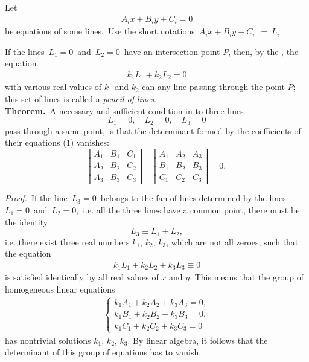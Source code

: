 \documentclass[12pt]{article}
\theoremstyle{definition}
\begin{document}
Let 
\begin{align}
A_ix+B_iy+C_i = 0
\end{align}
be equations of some lines.\, Use the short notations\, $A_ix+B_iy+C_i \,:=\, L_i$.

If the lines\, $L_1 = 0$\, and\, $L_2 = 0$\, have an intersection point $P$, then, by the , the equation
\begin{align}
k_1L_1+k_2L_2 = 0
\end{align}
with various real values of $k_1$ and $k_2$ can  any line passing through the point $P$; this set of lines is called a {\em pencil of lines}.\\
 

\textbf{Theorem.}\, A necessary and sufficient condition in  to three lines
$$L_1 = 0, \quad L_2 = 0, \quad L_3 = 0$$
pass through a same point, is that the determinant formed by the coefficients of their equations (1) vanishes:
$$
\left|\begin{matrix}
A_1 & B_1 & C_1\\
A_2 & B_2 & C_2\\
A_3 & B_3 & C_3
\end{matrix}\right| = 
\left|\begin{matrix}
A_1 & A_2 & A_3\\
B_1 & B_2 & B_3\\
C_1 & C_2 & C_3
\end{matrix}\right| = 0.
$$

{\em Proof.}\, If the line\, $L_3 = 0$\, belongs to the fan of lines determined by the lines\, $L_1 = 0$\, and\, $L_2 = 0$,\, i.e. all the three lines have a common point, there must be the identity
$$L_3 \equiv L_1+L_2,$$
i.e. there exist three real numbers $k_1$, $k_2$, $k_3$, which are not all zeroes, such that the equation
\begin{align}
k_1L_1+k_2L_2+k_3L_3 \equiv 0
\end{align}
is satisfied identically by all real values of $x$ and $y$.
This means that the group of homogeneous linear equations
\begin{align*}
\begin{cases}
k_1A_1+k_2A_2+k_3A_3 = 0,\\
k_1B_1+k_2B_2+k_3B_3 = 0,\\  
k_1C_1+k_2C_2+k_3C_3 = 0
\end{cases}
\end{align*}
has nontrivial solutions $k_1,\,k_2,\,k_3$.
By linear algebra, it follows that the determinant of this group of equations has to vanish.
\end{document}
